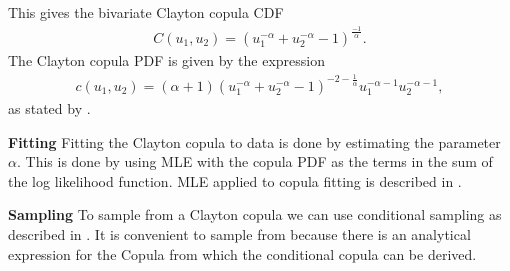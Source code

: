 This gives the bivariate Clayton copula \gls{CDF}
\begin{align*}
    C(u_1,u_2) = (u_1^{-\alpha} + u_2^{-\alpha}-1)^{\frac{-1}{\alpha}}.
\end{align*}
The Clayton copula \gls{PDF} is given by the expression
\begin{align*}
    c(u_1,u_2) = (\alpha+1)(u_1^{-\alpha}+u_2^{-\alpha}-1)^{-2- \frac{1}{\alpha}}u_1^{-\alpha -1} u_2^{-\alpha -1},
\end{align*}
as stated by . 

\textbf{Fitting}
Fitting the Clayton copula to data is done by estimating the parameter $\alpha$. This is done by using \gls{MLE} with the copula \gls{PDF} as the terms in the sum of the log likelihood function. \gls{MLE} applied to copula fitting is described in . 

\textbf{Sampling}
To sample from a Clayton copula we can use conditional sampling as described in . It is convenient to sample from because there is an analytical expression for the Copula from which the conditional copula can be derived. 







